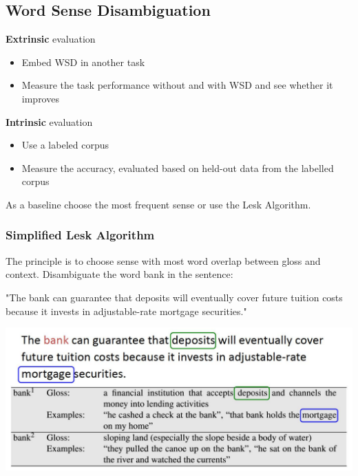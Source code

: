 \documentclass[11pt]{article}
\begin{document}
\subsection{Word Sense Disambiguation}
\textbf{Extrinsic} evaluation
\begin{itemize}
	\item Embed WSD in another task
	\item Measure the task performance without and with WSD and see whether it improves
\end{itemize}
\textbf{Intrinsic} evaluation
\begin{itemize}
	\item Use a labeled corpus
	\item Measure the accuracy, evaluated based on held-out data from the labelled corpus
\end{itemize}
As a baseline choose the most frequent sense or use the Lesk Algorithm.

\subsubsection{Simplified Lesk Algorithm}
The principle is to choose sense with most word overlap between gloss and context. Disambiguate the word bank in the sentence:

"The bank can guarantee that deposits will eventually cover future tuition costs because it invests in adjustable-rate mortgage securities."

\begin{center}
	\includegraphics[width=0.7\linewidth]{img/simplified_lesk_algorithm}
\end{center}
\end{document}
